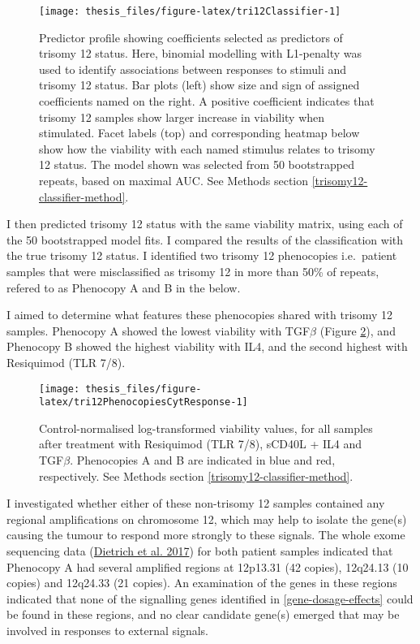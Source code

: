 \documentclass[11pt, a4paper, twosided]{book}
\begin{document}
\begin{figure}

{\centering \texttt{[image: thesis\_files/figure-latex/tri12Classifier-1]} 

}

\caption{Predictor profile showing coefficients selected as predictors of trisomy 12 status. Here, binomial modelling with L1-penalty was used to identify associations between responses to stimuli and trisomy 12 status. Bar plots (left) show size and sign of assigned coefficients named on the right. A positive coefficient indicates that trisomy 12 samples show larger increase in viability when stimulated. Facet labels (top) and corresponding heatmap below show how the viability with each named stimulus relates to trisomy 12 status. The model shown was selected from 50 bootstrapped repeats, based on maximal AUC. See Methods section \ref{trisomy12-classifier-method}.}\label{fig:tri12Classifier}
\end{figure}
I then predicted trisomy 12 status with the same viability matrix, using each of the 50 bootstrapped model fits. I compared the results of the classification with the true trisomy 12 status. I identified two trisomy 12 phenocopies i.e.~patient samples that were misclassified as trisomy 12 in more than 50\% of repeats, refered to as Phenocopy A and B in the below.

I aimed to determine what features these phenocopies shared with trisomy 12 samples. Phenocopy A showed the lowest viability with TGF\(\beta\) (Figure \ref{fig:tri12PhenocopiesCytResponse}), and Phenocopy B showed the highest viability with IL4, and the second highest with Resiquimod (TLR 7/8).


\begin{figure}

{\centering \texttt{[image: thesis\_files/figure-latex/tri12PhenocopiesCytResponse-1]} 

}

\caption{Control-normalised log-transformed viability values, for all samples after treatment with Resiquimod (TLR 7/8), sCD40L + IL4 and TGF\(\beta\). Phenocopies A and B are indicated in blue and red, respectively. See Methods section \ref{trisomy12-classifier-method}.}\label{fig:tri12PhenocopiesCytResponse}
\end{figure}
I investigated whether either of these non-trisomy 12 samples contained any regional amplifications on chromosome 12, which may help to isolate the gene(s) causing the tumour to respond more strongly to these signals. The whole exome sequencing data (\protect\hyperlink{ref-JCIpaper}{Dietrich et al. 2017}) for both patient samples indicated that Phenocopy A had several amplified regions at 12p13.31 (42 copies), 12q24.13 (10 copies) and 12q24.33 (21 copies). An examination of the genes in these regions indicated that none of the signalling genes identified in \ref{gene-dosage-effects} could be found in these regions, and no clear candidate gene(s) emerged that may be involved in responses to external signals.
\end{document}
